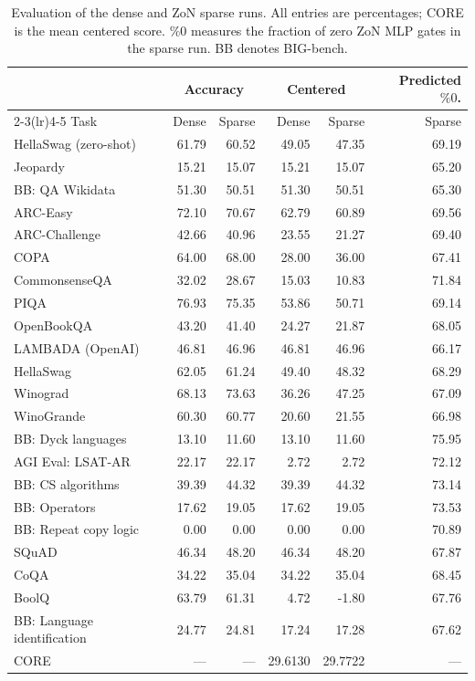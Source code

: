 \begin{table}[h]
\caption{Evaluation of the dense and ZoN sparse runs. All entries are percentages;
CORE is the mean centered score. $\%0$ measures the fraction of zero ZoN
MLP gates in the sparse run. BB denotes BIG-bench.}
\label{tab:zon_tasks}
\begin{center}
\small
\setlength{\tabcolsep}{4pt}
\begin{tabular}{lrrrrr}
\toprule
& \multicolumn{2}{c}{Accuracy} & \multicolumn{2}{c}{Centered} & Predicted $\%0$. \\
\cmidrule(lr){2-3}\cmidrule(lr){4-5}
Task & Dense & Sparse & Dense & Sparse & Sparse \\
\midrule
HellaSwag (zero-shot) & 61.79 & 60.52 & 49.05 & 47.35 & 69.19 \\
Jeopardy & 15.21 & 15.07 & 15.21 & 15.07 & 65.20 \\
BB: QA Wikidata & 51.30 & 50.51 & 51.30 & 50.51 & 65.30 \\
ARC-Easy & 72.10 & 70.67 & 62.79 & 60.89 & 69.56 \\
ARC-Challenge & 42.66 & 40.96 & 23.55 & 21.27 & 69.40 \\
COPA & 64.00 & 68.00 & 28.00 & 36.00 & 67.41 \\
CommonsenseQA & 32.02 & 28.67 & 15.03 & 10.83 & 71.84 \\
PIQA & 76.93 & 75.35 & 53.86 & 50.71 & 69.14 \\
OpenBookQA & 43.20 & 41.40 & 24.27 & 21.87 & 68.05 \\
LAMBADA (OpenAI) & 46.81 & 46.96 & 46.81 & 46.96 & 66.17 \\
HellaSwag & 62.05 & 61.24 & 49.40 & 48.32 & 68.29 \\
Winograd & 68.13 & 73.63 & 36.26 & 47.25 & 67.09 \\
WinoGrande & 60.30 & 60.77 & 20.60 & 21.55 & 66.98 \\
BB: Dyck languages & 13.10 & 11.60 & 13.10 & 11.60 & 75.95 \\
AGI Eval: LSAT-AR & 22.17 & 22.17 & 2.72 & 2.72 & 72.12 \\
BB: CS algorithms & 39.39 & 44.32 & 39.39 & 44.32 & 73.14 \\
BB: Operators & 17.62 & 19.05 & 17.62 & 19.05 & 73.53 \\
BB: Repeat copy logic & 0.00 & 0.00 & 0.00 & 0.00 & 70.89 \\
SQuAD & 46.34 & 48.20 & 46.34 & 48.20 & 67.87 \\
CoQA & 34.22 & 35.04 & 34.22 & 35.04 & 68.45 \\
BoolQ & 63.79 & 61.31 & 4.72 & -1.80 & 67.76 \\
BB: Language identification & 24.77 & 24.81 & 17.24 & 17.28 & 67.62 \\
\midrule
CORE & --- & --- & 29.6130 & 29.7722 & --- \\
\bottomrule
\end{tabular}
\end{center}
\end{table}
